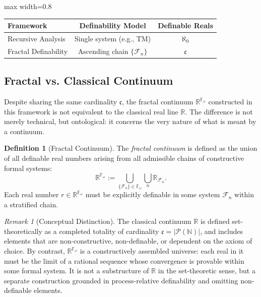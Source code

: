 \documentclass[12pt]{article}
\theoremstyle{definition}
\newtheorem{definition}{Definition}[section]
\theoremstyle{plain}
\theoremstyle{remark}
\newtheorem*{remark}{Remark}
\begin{document}
\begin{center}
\begin{adjustbox}{max width=0.8\textwidth}
\begin{tabular}{@{} lcc @{} }
\toprule
\textbf{Framework} & \textbf{Definability Model} & \textbf{Definable Reals} \\
\midrule
Recursive Analysis & Single system (e.g., TM) & $\aleph_0$ \\
Fractal Definability & Ascending chain $\{ \mathcal{F}_n \}$ & $\mathfrak{c}$ \\
\bottomrule
\end{tabular}
\end{adjustbox}
\end{center}

\subsection*{Fractal vs. Classical Continuum}

Despite sharing the same cardinality \( \mathfrak{c} \), the fractal continuum \( \mathbb{R}^{\mathbb{F}_\omega} \) constructed in this framework is not equivalent to the classical real line \( \mathbb{R} \). The difference is not merely technical, but ontological: it concerns the very nature of what is meant by a continuum.

\begin{definition}[Fractal Continuum]
The \emph{fractal continuum} is defined as the union of all definable real numbers arising from all admissible chains of constructive formal systems:
\[
\mathbb{R}^{\mathbb{F}_\omega} := \bigcup_{\{\mathcal{F}_n\} \in \mathbb{F}_\omega} \bigcup_{n} \mathbb{R}_{\mathcal{F}_n}.
\]
Each real number \( r \in \mathbb{R}^{\mathbb{F}_\omega} \) must be explicitly definable in some system \( \mathcal{F}_n \) within a stratified chain.
\end{definition}

\begin{remark}[Conceptual Distinction]
The classical continuum \( \mathbb{R} \) is defined set-theoretically as a completed totality of cardinality \( \mathfrak{c} = |\mathcal{P}(\mathbb{N})| \), and includes elements that are non-constructive, non-definable, or dependent on the axiom of choice. By contrast, \( \mathbb{R}^{\mathbb{F}_\omega} \) is a constructively assembled universe: each real in it must be the limit of a rational sequence whose convergence is provable within some formal system. It is not a substructure of \( \mathbb{R} \) in the set-theoretic sense, but a separate construction grounded in process-relative definability and omitting non-definable elements.
\end{remark}
\end{document}

